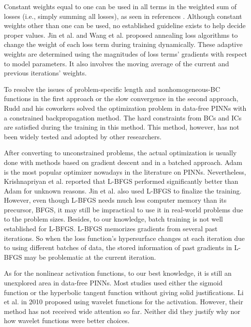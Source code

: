Constant weights equal to one can be used in all terms in the weighted sum of losses (i.e., simply summing all losses), as seen in references \cite{lagaris_artificial_1998,sirignano_dgm:_2018,dockhorn_discussion_2019}.
Although constant weights other than one can be used, no established guideline exists to help decide proper values.
Jin et al. \cite{jin_nsfnets_2020} and Wang et al. \cite{wang_understanding_2021} proposed annealing loss algorithms to change the weight of each loss term during training dynamically.
These adaptive weights are determined using the magnitudes of loss terms' gradients with respect to model parameters.
It also involves the moving average of the current and previous iterations' weights.

To resolve the issues of problem-specific length and nonhomogeneous-BC functions in the first approach or the slow convergence in the second approach, Rudd and his coworkers \cite{rudd_constrained_2014,rudd_constrained_2015} solved the optimization problem in data-free PINNs with a constrained backpropagation method.
The hard constraints from BCs and ICs are satisfied during the training in this method.
This method, however, has not been widely tested and adopted by other researchers.

After converting to unconstrained problems, the actual optimization is usually done with methods based on gradient descent and in a batched approach. 
Adam \cite{kingma_adam_2017} is the most popular optimizer nowadays in the literature on PINNs.
Nevertheless, Krishnapriyan et al. \cite{krishnapriyan_characterizing_2021} reported that L-BFGS performed significantly better than Adam for unknown reasons.
Jin et al. \cite{jin_nsfnets_2020} also used L-BFGS to finalize the training.
However, even though L-BFGS needs much less computer memory than its precursor, BFGS, it may still be impractical to use it in real-world problems due to the problem sizes.
Besides, to our knowledge, batch training is not well established for L-BFGS.
L-BFGS memorizes gradients from several past iterations.
So when the loss function's hypersurface changes at each iteration due to using different batches of data, the stored information of past gradients in L-BFGS may be problematic at the current iteration.

As for the nonlinear activation functions, to our best knowledge, it is still an unexplored area in data-free PINNs.
Most studies used either the sigmoid function or the hyperbolic tangent function without giving solid justifications.
Li et al. \cite{li_integration_2010} in 2010 proposed using wavelet functions for the activation.
However, their method has not received wide attention so far.
Neither did they justify why nor how wavelet functions were better choices.
